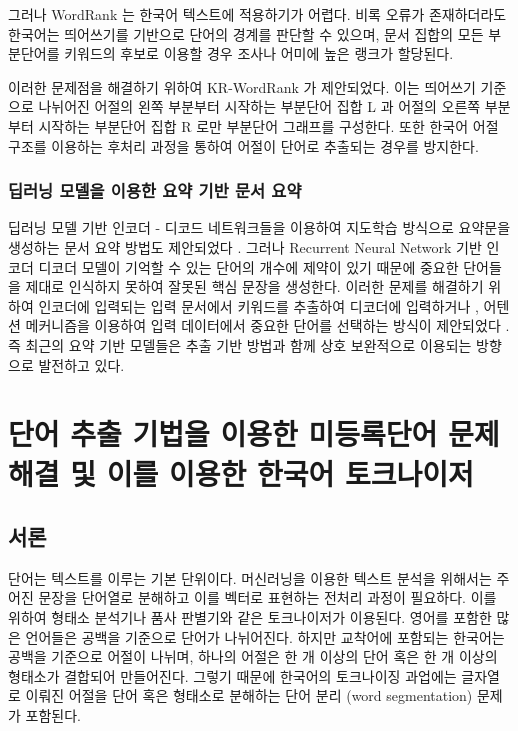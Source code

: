 \documentclass[oneside, ko,phd]{snuthesis_utf8_kor}
\begin{document}
그러나 WordRank 는 한국어 텍스트에 적용하기가 어렵다.
비록 오류가 존재하더라도 한국어는 띄어쓰기를 기반으로 단어의 경계를 판단할 수 있으며, 문서 집합의 모든 부분단어를 키워드의 후보로 이용할 경우 조사나 어미에 높은 랭크가 할당된다.

이러한 문제점을 해결하기 위하여 KR-WordRank \cite{kim2014kr} 가 제안되었다.
이는 띄어쓰기 기준으로 나뉘어진 어절의 왼쪽 부분부터 시작하는 부분단어 집합 L 과 어절의 오른쪽 부분부터 시작하는 부분단어 집합 R 로만 부분단어 그래프를 구성한다.
또한 한국어 어절 구조를 이용하는 후처리 과정을 통하여 어절이 단어로 추출되는 경우를 방지한다.

\subsection{딥러닝 모델을 이용한 요약 기반 문서 요약}

딥러닝 모델 기반 인코더 - 디코드 네트워크들을 이용하여 지도학습 방식으로 요약문을 생성하는 문서 요약 방법도 제안되었다 \cite{rush2015neural}.
그러나 Recurrent Neural Network 기반 인코더 디코더 모델이 기억할 수 있는 단어의 개수에 제약이 있기 때문에 중요한 단어들을 제대로 인식하지 못하여 잘못된 핵심 문장을 생성한다.
이러한 문제를 해결하기 위하여 인코더에 입력되는 입력 문서에서 키워드를 추출하여 디코더에 입력하거나 \cite{nallapati2016abstractive}, 어텐션 메커니즘을 이용하여 입력 데이터에서 중요한 단어를 선택하는 방식이 제안되었다 \cite{see2017get, gu2016incorporating}.
즉 최근의 요약 기반 모델들은 추출 기반 방법과 함께 상호 보완적으로 이용되는 방향으로 발전하고 있다.

\newpage
\chapter{단어 추출 기법을 이용한 미등록단어 문제 해결 및 이를 이용한 한국어 토크나이저} \label{word_extraction}

\section{서론}
단어는 텍스트를 이루는 기본 단위이다.
머신러닝을 이용한 텍스트 분석을 위해서는 주어진 문장을 단어열로 분해하고 이를 벡터로 표현하는 전처리 과정이 필요하다.
이를 위하여 형태소 분석기나 품사 판별기와 같은 토크나이저가 이용된다.
영어를 포함한 많은 언어들은 공백을 기준으로 단어가 나뉘어진다.
하지만 교착어에 포함되는 한국어는 공백을 기준으로 어절이 나뉘며, 하나의 어절은 한 개 이상의 단어 혹은 한 개 이상의 형태소가 결합되어 만들어진다.
그렇기 때문에 한국어의 토크나이징 과업에는 글자열로 이뤄진 어절을 단어 혹은 형태소로 분해하는 단어 분리 (word segmentation) 문제가 포함된다.
\end{document}

